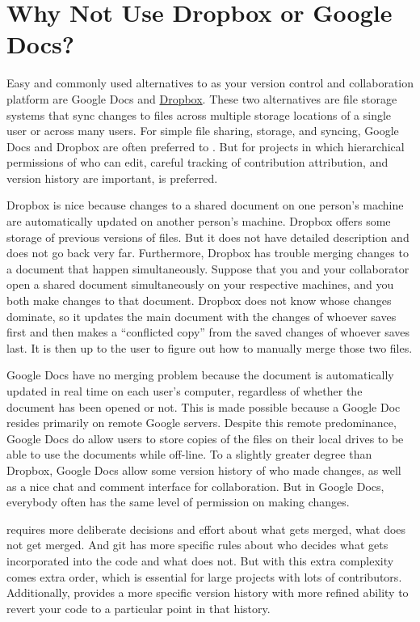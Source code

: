\section{Why Not Use Dropbox or Google Docs?}\label{SecGitDropb}

  Easy and commonly used alternatives to \git as your version control and collaboration platform are Google Docs and \href{https://www.dropbox.com/}{Dropbox}. These two \git alternatives are file storage systems that sync changes to files across multiple storage locations of a single user or across many users. For simple file sharing, storage, and syncing, Google Docs and Dropbox are often preferred to \git. But for projects in which hierarchical permissions of who can edit, careful tracking of contribution attribution, and version history are important, \git is preferred.

  Dropbox is nice because changes to a shared document on one person's machine are automatically updated on another person's machine. Dropbox offers some storage of previous versions of files. But it does not have detailed description and does not go back very far. Furthermore, Dropbox has trouble merging changes to a document that happen simultaneously. Suppose that you and your collaborator open a shared document simultaneously on your respective machines, and you both make changes to that document. Dropbox does not know whose changes dominate, so it updates the main document with the changes of whoever saves first and then makes a ``conflicted copy'' from the saved changes of whoever saves last. It is then up to the user to figure out how to manually merge those two files.

  Google Docs have no merging problem because the document is automatically updated in real time on each user's computer, regardless of whether the document has been opened or not. This is made possible because a Google Doc resides primarily on remote Google servers. Despite this remote predominance, Google Docs do allow users to store copies of the files on their local drives to be able to use the documents while off-line. To a slightly greater degree than Dropbox, Google Docs allow some version history of who made changes, as well as a nice chat and comment interface for collaboration. But in Google Docs, everybody often has the same level of permission on making changes.

  \git requires more deliberate decisions and effort about what gets merged, what does not get merged. And git has more specific rules about who decides what gets incorporated into the code and what does not. But with this extra complexity comes extra order, which is essential for large projects with lots of contributors. Additionally, \git provides a more specific version history with more refined ability to revert your code to a particular point in that history.

